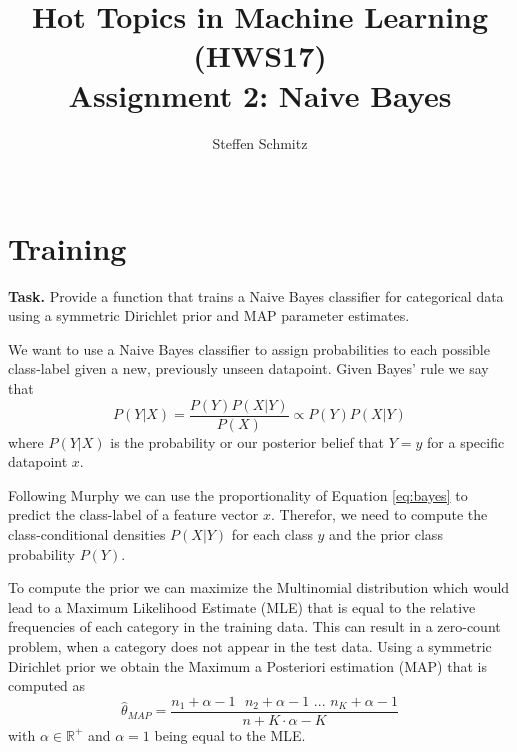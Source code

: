 \documentclass{support/acm_proc_article-sp}
\begin{document}
    \title{Hot Topics in Machine Learning (HWS17) \\ Assignment 2: Naive Bayes}

    \author{
    \alignauthor
    Steffen Schmitz\\
    \\
    }

    \maketitle


    \section{Training}
    \label{sec:training}

    \textbf{Task.} Provide a function that trains a Naive Bayes classifier for categorical data using a symmetric Dirichlet
    prior and MAP parameter estimates.

    We want to use a Naive Bayes classifier to assign probabilities to each possible class-label given a new, previously
    unseen datapoint.
    Given Bayes' rule we say that
    \begin{equation}
        P(Y | X) = \frac{P(Y)P(X | Y)}{P(X)} \propto P(Y)P(X | Y)
        \label{eq:bayes}
    \end{equation}
    where $P(Y | X)$ is the probability or our posterior belief that $Y = y$ for a specific datapoint $x$.

    Following Murphy \cite[p.65]{Murphy:2012:MLP:2380985} we can use the proportionality of Equation \ref{eq:bayes} to predict
    the class-label of a feature vector $x$.
    Therefor, we need to compute the class-conditional densities $P(X | Y)$ for each class $y$ and the prior class
    probability $P(Y)$.

    To compute the prior we can maximize the Multinomial distribution which would lead to a Maximum Likelihood Estimate (MLE)
    that is equal to the relative frequencies of each category in the training data.
    This can result in a zero-count problem, when a category does not appear in the test data.
    Using a symmetric Dirichlet prior we obtain the Maximum a Posteriori estimation (MAP) that is computed as
    \begin{equation}
        \hat{\theta}_{MAP} = \frac{n_1 + \alpha - 1 \mbox{  } n_2 + \alpha - 1 \mbox{ ... } n_K + \alpha - 1}{n + K \cdot \alpha - K}
    \end{equation}
    with $\alpha \in \mathbb{R}^+$ and $\alpha = 1$ being equal to the MLE.
\end{document}

